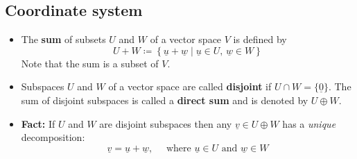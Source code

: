 \documentclass[11pt,twoside]{report}
\newcommand{\vecnot}{\underline}
\begin{document}
\subsection{Coordinate system} 

\begin{itemize}

\item The \textbf{sum} of subsets  $U$ and $W$ of a vector space $V$ is defined by
\begin{equation*}
U + W \coloneqq \left\{ \vecnot{u} + \vecnot{w} \mid \vecnot{u} \in U, \, \vecnot{w} \in W  \right \} 
\end{equation*}
Note that the sum is a subset of $V$. 



\item 
Subspaces $U$ and $W$ of a vector space are called \textbf{disjoint} if $U \cap W = \{\vecnot{0}\}$. The sum of disjoint subspaces is called a  \textbf{direct sum} and is denoted by  $U \oplus W$. 




\item \textbf{Fact:} If $U$ and $W$ are disjoint subspaces then any $\vecnot{v} \in U \oplus W$ has a \emph{unique} decomposition:
\[
\vecnot{v} = \vecnot{u} + \vecnot{w}, \quad \text{ where $\vecnot{u} \in U$ and $\vecnot{w} \in W$}
\]


\end{itemize}
\end{document}
